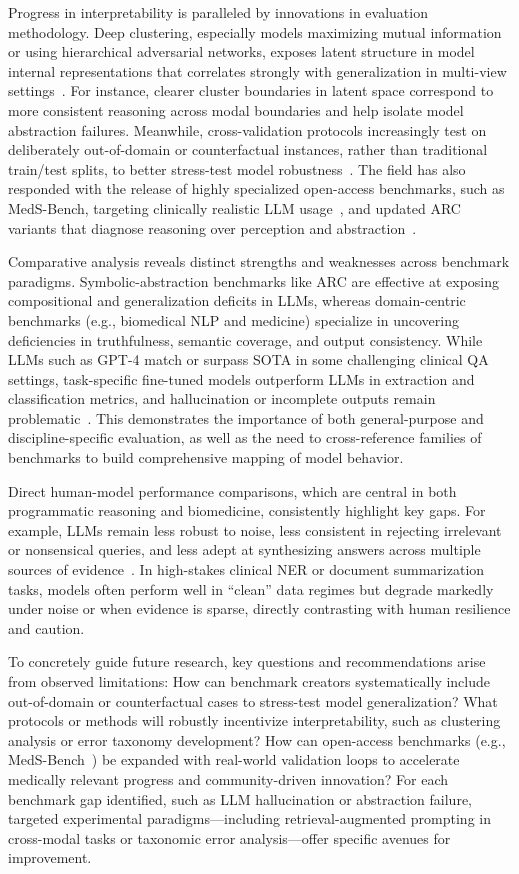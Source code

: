 \documentclass[sigconf]{acmart}
\begin{document}
Progress in interpretability is paralleled by innovations in evaluation methodology. Deep clustering, especially models maximizing mutual information or using hierarchical adversarial networks, exposes latent structure in model internal representations that correlates strongly with generalization in multi-view settings~\cite{ref79,ref85}. For instance, clearer cluster boundaries in latent space correspond to more consistent reasoning across modal boundaries and help isolate model abstraction failures. Meanwhile, cross-validation protocols increasingly test on deliberately out-of-domain or counterfactual instances, rather than traditional train/test splits, to better stress-test model robustness~\cite{ref94,ref95}. The field has also responded with the release of highly specialized open-access benchmarks, such as MedS-Bench, targeting clinically realistic LLM usage~\cite{ref95}, and updated ARC variants that diagnose reasoning over perception and abstraction~\cite{ref92}.

Comparative analysis reveals distinct strengths and weaknesses across benchmark paradigms. Symbolic-abstraction benchmarks like ARC are effective at exposing compositional and generalization deficits in LLMs, whereas domain-centric benchmarks (e.g., biomedical NLP and medicine) specialize in uncovering deficiencies in truthfulness, semantic coverage, and output consistency. While LLMs such as GPT-4 match or surpass SOTA in some challenging clinical QA settings, task-specific fine-tuned models outperform LLMs in extraction and classification metrics, and hallucination or incomplete outputs remain problematic~\cite{ref94,ref95}. This demonstrates the importance of both general-purpose and discipline-specific evaluation, as well as the need to cross-reference families of benchmarks to build comprehensive mapping of model behavior.

Direct human-model performance comparisons, which are central in both programmatic reasoning and biomedicine, consistently highlight key gaps. For example, LLMs remain less robust to noise, less consistent in rejecting irrelevant or nonsensical queries, and less adept at synthesizing answers across multiple sources of evidence~\cite{ref92,ref94,ref95}. In high-stakes clinical NER or document summarization tasks, models often perform well in ``clean'' data regimes but degrade markedly under noise or when evidence is sparse, directly contrasting with human resilience and caution.

To concretely guide future research, key questions and recommendations arise from observed limitations: How can benchmark creators systematically include out-of-domain or counterfactual cases to stress-test model generalization? What protocols or methods will robustly incentivize interpretability, such as clustering analysis or error taxonomy development? How can open-access benchmarks (e.g., MedS-Bench~\cite{ref95}) be expanded with real-world validation loops to accelerate medically relevant progress and community-driven innovation? For each benchmark gap identified, such as LLM hallucination or abstraction failure, targeted experimental paradigms---including retrieval-augmented prompting in cross-modal tasks or taxonomic error analysis---offer specific avenues for improvement.
\end{document}
